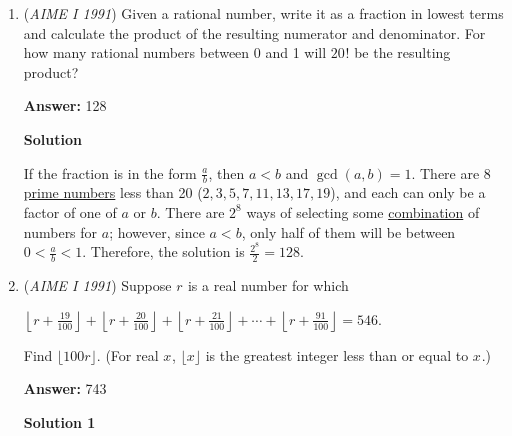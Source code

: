 \begin{enumerate}
 



\textbf{Solution 2}

Notice that the equation is satisfied twice for every sine period (which is $\frac{2}{5}$), except in the sole case when the two equations equate to $0$. In that case, the equation is satisfied twice but only at the one instance when $y=0$. Hence, it is double-counted in our final solution, so we have to subtract it out. We then compute:$32 \cdot \frac{5}{2} \cdot 2 - 1 = \boxed {159}$



	\item (\textit{AIME I 1991}) Given a rational number, write it as a fraction in lowest terms and calculate the product of the resulting numerator and denominator. For how many rational numbers between 0 and 1 will  $20_{}^{}!$ be the resulting product? 


 
 \textbf{Answer: }128



\textbf{Solution}

If the fraction is in the form $\frac{a}{b}$, then $a < b$ and $\gcd(a,b) = 1$. There are 8 \href{https://artofproblemsolving.com/wiki/index.php?title=Prime\_number}{prime numbers} less than 20 ($2, 3, 5, 7, 11, 13, 17, 19$), and each can only be a factor of one of $a$ or $b$. There are $2^8$ ways of selecting some \href{https://artofproblemsolving.com/wiki/index.php?title=Combination}{combination} of numbers for $a$; however, since $a<b$, only half of them will be between $0 < \frac{a}{b} < 1$. Therefore, the solution is $\frac{2^8}{2} = \boxed{128}$.

 


	\item (\textit{AIME I 1991}) Suppose $r^{}_{}$ is a real number for which


 $\left\lfloor r + \frac{19}{100} \right\rfloor + \left\lfloor r + \frac{20}{100} \right\rfloor + \left\lfloor r + \frac{21}{100} \right\rfloor + \cdots + \left\lfloor r + \frac{91}{100} \right\rfloor = 546.$

 Find $\lfloor 100r \rfloor$. (For real $x^{}_{}$, $\lfloor x \rfloor$ is the greatest integer less than or equal to $x^{}_{}$.)


 
 \textbf{Answer: }743



\textbf{Solution 1}


\end{enumerate}
